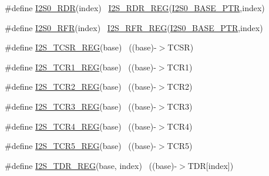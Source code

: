 \begin{DoxyCompactItemize}
\#define \hyperlink{group___i2_s___register___accessor___macros_ga37d505a0ce80827c6133a5d53346e73f}{I2\+S0\+\_\+\+R\+DR}(index)                                                ~\hyperlink{group___i2_s___register___accessor___macros_ga18b3e6efd2a957d910429a72b273bea9}{I2\+S\+\_\+\+R\+D\+R\+\_\+\+R\+EG}(\hyperlink{group___i2_s___peripheral_ga2eac5d85244610150239927c71b2e147}{I2\+S0\+\_\+\+B\+A\+S\+E\+\_\+\+P\+TR},index)
\item 
\#define \hyperlink{group___i2_s___register___accessor___macros_gab54d7c82666015d70bab5044fb12ef6d}{I2\+S0\+\_\+\+R\+FR}(index)                                                ~\hyperlink{group___i2_s___register___accessor___macros_ga0c209378f864f66e1f88468118ee87aa}{I2\+S\+\_\+\+R\+F\+R\+\_\+\+R\+EG}(\hyperlink{group___i2_s___peripheral_ga2eac5d85244610150239927c71b2e147}{I2\+S0\+\_\+\+B\+A\+S\+E\+\_\+\+P\+TR},index)
\item 
\#define \hyperlink{group___i2_s___register___accessor___macros_gacffda7930e76dbbaf37eaa2e5392a3da}{I2\+S\+\_\+\+T\+C\+S\+R\+\_\+\+R\+EG}(base)                                          ~((base)-\/$>$T\+C\+SR)
\item 
\#define \hyperlink{group___i2_s___register___accessor___macros_ga13c61275025dc7fbdca74ac8b98b0307}{I2\+S\+\_\+\+T\+C\+R1\+\_\+\+R\+EG}(base)                                          ~((base)-\/$>$T\+C\+R1)
\item 
\#define \hyperlink{group___i2_s___register___accessor___macros_ga5fb00e617bbbfcd3b1cce3ad6bdb656d}{I2\+S\+\_\+\+T\+C\+R2\+\_\+\+R\+EG}(base)                                          ~((base)-\/$>$T\+C\+R2)
\item 
\#define \hyperlink{group___i2_s___register___accessor___macros_ga522cedd1600fdaaa70c581dfc1f624ea}{I2\+S\+\_\+\+T\+C\+R3\+\_\+\+R\+EG}(base)                                          ~((base)-\/$>$T\+C\+R3)
\item 
\#define \hyperlink{group___i2_s___register___accessor___macros_ga3ca290e5e99bb9ca130ff9eb2980ab95}{I2\+S\+\_\+\+T\+C\+R4\+\_\+\+R\+EG}(base)                                          ~((base)-\/$>$T\+C\+R4)
\item 
\#define \hyperlink{group___i2_s___register___accessor___macros_gad75c8d22ba5ae3b82a7d2251cc70a77b}{I2\+S\+\_\+\+T\+C\+R5\+\_\+\+R\+EG}(base)                                          ~((base)-\/$>$T\+C\+R5)
\item 
\#define \hyperlink{group___i2_s___register___accessor___macros_ga87e46bded71d5375c77dbe4f93f1fc5c}{I2\+S\+\_\+\+T\+D\+R\+\_\+\+R\+EG}(base,  index)                                ~((base)-\/$>$T\+DR\mbox{[}index\mbox{]})

\end{DoxyCompactItemize}
